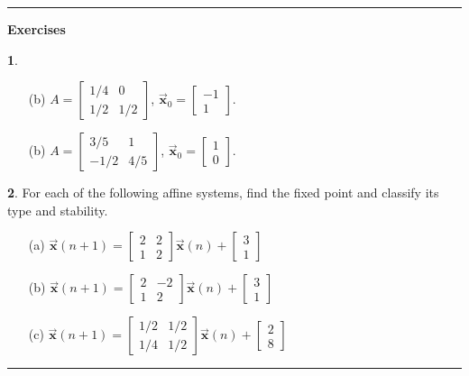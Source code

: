 \documentclass[reqno]{immbook}
\newcommand{\BX}{\vec{\textbf{x}}}
\newcommand{\ds}{\displaystyle}
\numberwithin{equation}{chapter}
\numberwithin{question}{section}
\numberwithin{theorem}{chapter}
\numberwithin{figure}{chapter}
\theoremstyle{definition}
\newtheorem{exercise}{}[section]
\newenvironment{exercises}%
{%
\medskip\hrule\medskip\noindent\textbf{Exercises}%
}%
{%
\medskip\hrule
}
\begin{document}
\begin{exercises}
\begin{exercise}
\begin{enumerate}
\item[(b)]
$\ds A  =  \begin{bmatrix}
              1/4 & 0 \\
              1/2 & 1/2
           \end{bmatrix}$, \hspace*{.25cm}
$\ds \BX_0 = \begin{bmatrix} -1 \\ 1 \end{bmatrix}$.
\item[(b)]
$\ds A  =  \begin{bmatrix}
              3/5 & 1 \\
              -1/2 & 4/5
           \end{bmatrix}$, \hspace*{.25cm} 
$\ds \BX_0 = \begin{bmatrix} 1 \\ 0 \end{bmatrix}$.
\end{enumerate}
\end{exercise}

\begin{exercise}
For each of the following affine systems, find the
fixed point and classify its type and stability.
\begin{enumerate}
\item[(a)] $\ds \BX(n+1) = \begin{bmatrix}
                         2 & 2 \\
                         1 & 2
                     \end{bmatrix}
                        \BX(n) + \begin{bmatrix} 3 \\ 1 \end{bmatrix}$
\item[(b)] $\ds \BX(n+1) = \begin{bmatrix}
                         2 & -2 \\
                         1 & 2
                     \end{bmatrix}
                        \BX(n) + \begin{bmatrix} 3 \\ 1 \end{bmatrix}$
\item[(c)] $\ds \BX(n+1) = \begin{bmatrix}
                         1/2 & 1/2 \\
                         1/4 & 1/2
                     \end{bmatrix}
                        \BX(n) + \begin{bmatrix} 2 \\ 8 \end{bmatrix}$
\end{enumerate}
\end{exercise}
\end{exercises}
\end{document}
